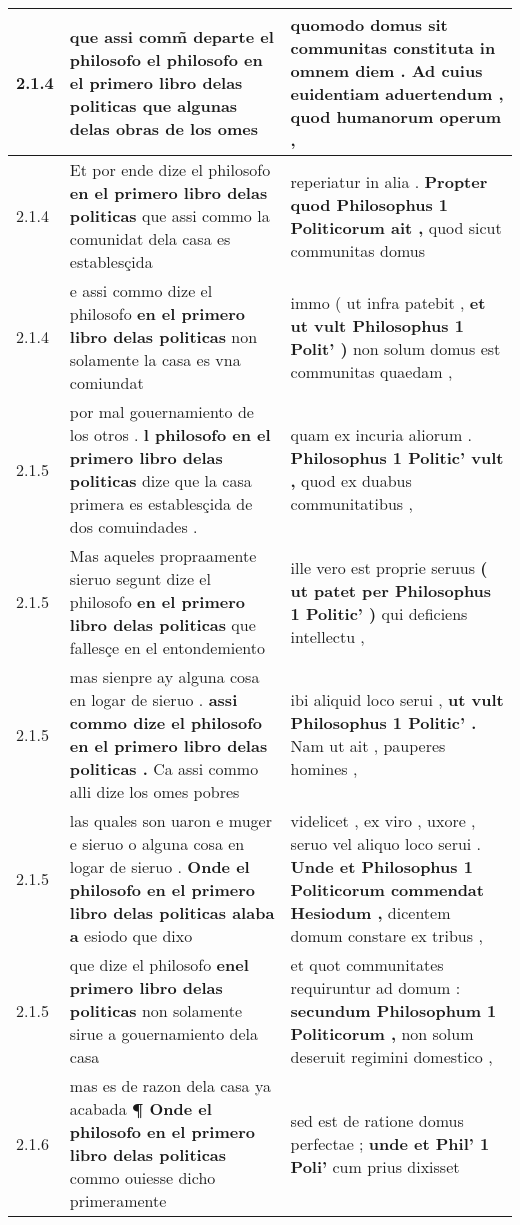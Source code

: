 \begin{tabular}{|p{1cm}|p{6.5cm}|p{6.5cm}|}
2.1.4 & que assi comm̃ departe el philosofo el philosofo \textbf{ en el primero libro delas politicas } que algunas delas obras de los omes & quomodo domus sit communitas constituta in omnem diem . \textbf{ Ad cuius euidentiam aduertendum , } quod humanorum operum , \\\hline
2.1.4 & Et por ende dize el philosofo \textbf{ en el primero libro delas politicas } que assi commo la comunidat dela casa es establesçida & reperiatur in alia . \textbf{ Propter quod Philosophus 1 Politicorum ait , } quod sicut communitas domus \\\hline
2.1.4 & e assi commo dize el philosofo \textbf{ en el primero libro delas politicas } non solamente la casa es vna comiundat & immo ( ut infra patebit , \textbf{ et ut vult Philosophus 1 Polit’ ) } non solum domus est communitas quaedam , \\\hline
2.1.5 & por mal gouernamiento de los otros . \textbf{ l philosofo en el primero libro delas politicas } dize que la casa primera es establesçida de dos comuindades . & quam ex incuria aliorum . \textbf{ Philosophus 1 Politic’ vult , } quod ex duabus communitatibus , \\\hline
2.1.5 & Mas aqueles propraamente sieruo segunt dize el philosofo \textbf{ en el primero libro delas politicas } que fallesçe en el entondemiento & ille vero est proprie seruus \textbf{ ( ut patet per Philosophus 1 Politic’ ) } qui deficiens intellectu , \\\hline
2.1.5 & mas sienpre ay alguna cosa en logar de sieruo . \textbf{ assi commo dize el philosofo en el primero libro delas politicas . } Ca assi commo alli dize los omes pobres & ibi aliquid loco serui , \textbf{ ut vult Philosophus 1 Politic’ . } Nam ut ait , pauperes homines , \\\hline
2.1.5 & las quales son uaron e muger e sieruo o alguna cosa en logar de sieruo . \textbf{ Onde el philosofo en el primero libro delas politicas alaba a } esiodo que dixo & videlicet , ex viro , uxore , seruo vel aliquo loco serui . \textbf{ Unde et Philosophus 1 Politicorum commendat Hesiodum , } dicentem domum constare ex tribus , \\\hline
2.1.5 & que dize el philosofo \textbf{ enel primero libro delas politicas } non solamente sirue a gouernamiento dela casa & et quot communitates requiruntur ad domum : \textbf{ secundum Philosophum 1 Politicorum , } non solum deseruit regimini domestico , \\\hline
2.1.6 & mas es de razon dela casa ya acabada \textbf{ ¶ Onde el philosofo en el primero libro delas politicas } commo ouiesse dicho primeramente & sed est de ratione domus perfectae ; \textbf{ unde et Phil’ 1 Poli’ } cum prius dixisset \\\hline

\end{tabular}
